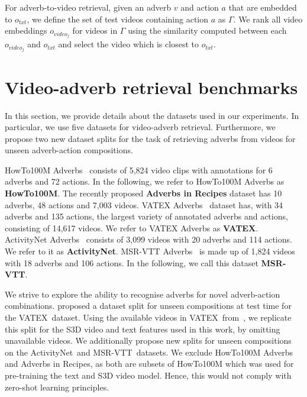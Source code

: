 \documentclass[table]{bmvc2k}
\newcommand{\vatex}{VATEX}
\newcommand{\msrvtt}{MSR-VTT}
\newcommand{\anet}{ActivityNet}
\newcommand{\air}{Adverbs in Recipes}
\begin{document}
For adverb-to-video retrieval, given an adverb $v$ and action $a$ that are embedded to $o_{txt}$, we define the set of test videos containing action $a$ as $\Gamma$. We rank all video embeddings $o_{video_j}$ for videos in $\Gamma$ using the similarity computed between each $o_{video_j}$ and $o_{txt}$ and select the video which is closest to $o_{txt}$. 

\section{Video-adverb retrieval benchmarks}
In this section, we provide details about the datasets used in our experiments. In particular, we use five datasets for video-adverb retrieval. Furthermore, we propose two new dataset splits for the task of retrieving adverbs from videos for unseen adverb-action compositions. 

\label{dataset_section}
HowTo100M Adverbs~\cite{doughty_action_2020} consists of 5,824 video clips with annotations for 6 adverbs and 72 actions. In the following, we refer to HowTo100M Adverbs as \textbf{HowTo100M}.
The recently proposed \textbf{\air} dataset has 10 adverbs, 48 actions and 7,003 videos. 
VATEX Adverbs~\cite{doughty_how_2022} dataset has, with 34 adverbs and 135 actions, the largest variety of annotated adverbs and actions, consisting of 14,617 videos. We refer to VATEX Adverbs as \textbf{VATEX}. ActivityNet Adverbs~\cite{doughty_how_2022} consists of 3,099 videos with 20 adverbs and 114 actions. We refer to it as \textbf{\anet}. MSR-VTT Adverbs~\cite{doughty_how_2022} is made up of 1,824 videos with 18 adverbs and 106 actions. In the following, we call this dataset \textbf{\msrvtt}.


We strive to explore the ability to recognise adverbs for novel adverb-action combinations.
\cite{doughty_how_2022} proposed a dataset split for unseen compositions at test time for the \vatex\ dataset. 
Using the available videos in \vatex\ from~\cite{moltisanti2023learning}, we replicate this split for the S3D video and text features used in this work, by omitting unavailable videos.
We additionally propose new splits for unseen compositions on the \anet\ and \msrvtt\ datasets. We exclude HowTo100M Adverbs and \air, as both are subsets of HowTo100M which was used for pre-training the text and S3D video model. Hence, this would not comply with zero-shot learning principles. 
\end{document}
